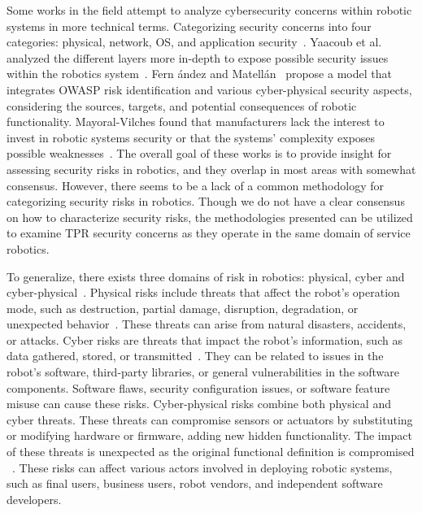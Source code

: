 Some works in the field attempt to analyze cybersecurity concerns within robotic
systems in more technical terms. Categorizing security concerns into four categories: physical, network, OS, and
application security~\cite[5]{robot_security_framework_2018}. Yaacoub et al. analyzed the different layers more in-depth to expose possible security issues within the robotics system~\cite[]{robotics_cyber_security_2022}. Fern
ández and
Matellán~\cite[
  76]{cyber_sec_robotics_privacy_safety_2017} propose a model that
integrates \ac{OWASP} risk identification and various cyber-physical security aspects, considering the sources, targets, and potential
consequences of robotic functionality. Mayoral-Vilches found that manufacturers lack the interest to invest in robotic systems security
or that the systems' complexity exposes possible weaknesses~\cite[]{robot_security_review_2022}. The overall goal of these works is to
provide insight for assessing security risks in robotics, and they overlap in most areas with somewhat consensus. However, there seems to be a lack of a common methodology for categorizing security risks in robotics. Though we do not have a clear consensus on how to characterize security risks, the methodologies presented can be utilized to examine \ac{TPR} security concerns as they operate in the
same domain of service robotics.

To generalize, there exists three domains of risk in robotics:
physical, cyber and cyber-physical~\cite[]{cyber_sec_robotics_privacy_safety_2017}.
Physical risks include threats that affect the robot's operation mode, such as destruction, partial damage, disruption, degradation, or
unexpected behavior~\cite[77]{cyber_sec_robotics_privacy_safety_2017}. These threats can arise from natural disasters, accidents, or
attacks. Cyber risks are threats that impact the robot's information, such as data gathered, stored, or transmitted~\cite[78]{
  cyber_sec_robotics_privacy_safety_2017}. They can be related to issues in the robot's software, third-party libraries, or general vulnerabilities in the software components. Software flaws, security configuration issues, or software feature misuse can cause these risks.
Cyber-physical risks combine both physical and cyber threats. These threats can compromise sensors or actuators by substituting or
modifying hardware or firmware, adding new hidden functionality.
The impact of these threats is unexpected as the original functional
definition is compromised ~\cite[77-78]{cyber_sec_robotics_privacy_safety_2017}. These risks can affect various actors involved in deploying robotic systems, such as final users, business users, robot vendors, and independent software developers.

